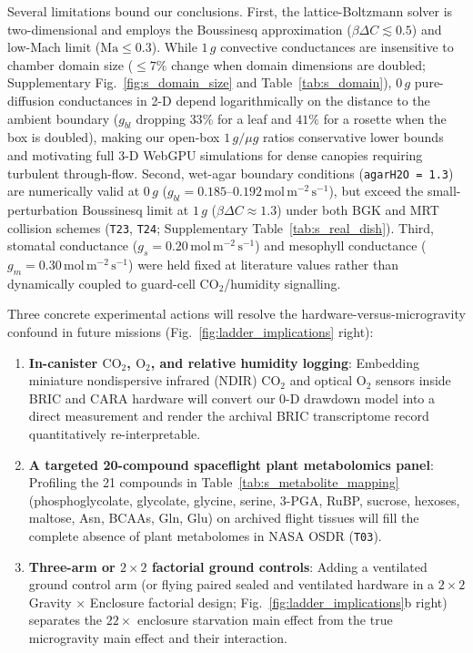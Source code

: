 \documentclass[preprint,11pt,numbers,sort&compress]{elsarticle}
\newcommand{\molms}{\ensuremath{\mathrm{mol\,m^{-2}\,s^{-1}}}}
\begin{document}
Several limitations bound our conclusions. First, the lattice-Boltzmann solver is two-dimensional and employs the Boussinesq approximation ($\beta\Delta C \lesssim 0.5$) and low-Mach limit ($\mathrm{Ma}\le 0.3$). While $1\,g$ convective conductances are insensitive to chamber domain size ($\le 7\%$ change when domain dimensions are doubled; Supplementary Fig.~\ref{fig:s_domain_size} and Table~\ref{tab:s_domain}), $0\,g$ pure-diffusion conductances in 2-D depend logarithmically on the distance to the ambient boundary ($g_{bl}$ dropping $33\%$ for a leaf and $41\%$ for a rosette when the box is doubled), making our open-box $1\,g/\mu g$ ratios conservative lower bounds and motivating full 3-D WebGPU simulations for dense canopies requiring turbulent through-flow. Second, wet-agar boundary conditions (\texttt{agarH2O = 1.3}) are numerically valid at $0\,g$ ($g_{bl} = 0.185\text{--}0.192\,\molms$), but exceed the small-perturbation Boussinesq limit at $1\,g$ ($\beta\Delta C\approx 1.3$) under both BGK and MRT collision schemes (\texttt{T23}, \texttt{T24}; Supplementary Table~\ref{tab:s_real_dish}). Third, stomatal conductance ($g_s = 0.20\,\molms$) and mesophyll conductance ($g_m = 0.30\,\molms$) were held fixed at literature values rather than dynamically coupled to guard-cell $\mathrm{CO_2}$/humidity signalling.

Three concrete experimental actions will resolve the hardware-versus-microgravity confound in future missions (Fig.~\ref{fig:ladder_implications} right):
\begin{enumerate}
    \item \textbf{In-canister $\mathrm{CO_2}$, $\mathrm{O_2}$, and relative humidity logging}: Embedding miniature nondispersive infrared (NDIR) $\mathrm{CO_2}$ and optical $\mathrm{O_2}$ sensors inside BRIC and CARA hardware will convert our 0-D drawdown model into a direct measurement and render the archival BRIC transcriptome record quantitatively re-interpretable.
    \item \textbf{A targeted 20-compound spaceflight plant metabolomics panel}: Profiling the 21 compounds in Table~\ref{tab:s_metabolite_mapping} (phosphoglycolate, glycolate, glycine, serine, 3-PGA, RuBP, sucrose, hexoses, maltose, Asn, BCAAs, Gln, Glu) on archived flight tissues will fill the complete absence of plant metabolomes in NASA OSDR (\texttt{T03}).
    \item \textbf{Three-arm or $2\times 2$ factorial ground controls}: Adding a ventilated ground control arm (or flying paired sealed and ventilated hardware in a $2\times 2$ Gravity $\times$ Enclosure factorial design; Fig.~\ref{fig:ladder_implications}b right) separates the $22\times$ enclosure starvation main effect from the true microgravity main effect and their interaction.
\end{enumerate}
\end{document}
